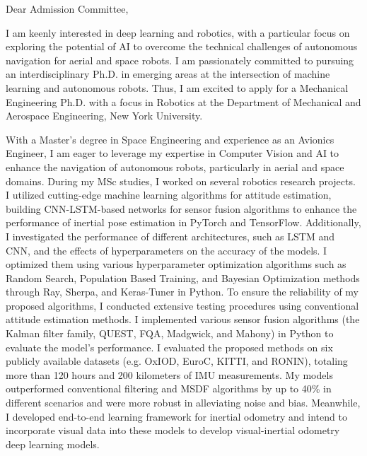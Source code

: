 \documentclass[a4,20pt]{article}
\begin{document}
\begin{large} 
Dear Admission Committee, \par

\vspace{-0.25cm} \quad I am keenly interested in deep learning and robotics, with a particular focus on exploring the potential of AI to overcome the technical challenges of autonomous navigation for aerial and space robots. I am passionately committed to pursuing an interdisciplinary Ph.D. in emerging areas at the intersection of machine learning and autonomous robots. Thus, I am excited to apply for a Mechanical Engineering Ph.D. with a focus in Robotics at the Department of Mechanical and Aerospace Engineering, New York University.\par

\vspace{-0.25cm} \quad With a Master's degree in Space Engineering and experience as an Avionics Engineer, I am eager to leverage my expertise in Computer Vision and AI to enhance the navigation of autonomous robots, particularly in aerial and space domains. During my MSc studies, I worked on several robotics research projects. I utilized cutting-edge machine learning algorithms for attitude estimation, building CNN-LSTM-based networks for sensor fusion algorithms to enhance the performance of inertial pose estimation in PyTorch and TensorFlow. Additionally, I investigated the performance of different architectures, such as LSTM and CNN, and the effects of hyperparameters on the accuracy of the models. I optimized them using various hyperparameter optimization algorithms such as Random Search, Population Based Training, and Bayesian Optimization methods through Ray, Sherpa, and Keras-Tuner in Python. To ensure the reliability of my proposed algorithms, I conducted extensive testing procedures using conventional attitude estimation methods. I implemented various sensor fusion algorithms (the Kalman filter family, QUEST, FQA, Madgwick, and Mahony) in Python to evaluate the model's performance. I evaluated the proposed methods on six publicly available datasets (e.g. OxIOD, EuroC, KITTI, and RONIN), totaling more than 120 hours and 200 kilometers of IMU measurements. My models outperformed conventional filtering and MSDF algorithms by up to 40\% in different scenarios and were more robust in alleviating noise and bias. Meanwhile, I developed end-to-end learning framework for inertial odometry and intend to incorporate visual data into these models to develop visual-inertial odometry deep learning models.\par


\end{large}
\end{document}

